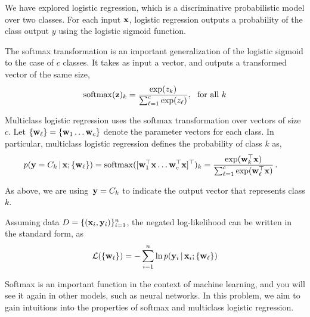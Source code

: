 \documentclass[submit]{harvardml}
\begin{document}
\newpage
\begin{problem}
%
  We have explored logistic regression, which is a discriminative
  probabilistic model over two classes. For each input $\mathbf{x}$,
  logistic regression outputs a probability of the class output $y$
  using the logistic sigmoid function.

  The softmax transformation is an important generalization of the logistic
  sigmoid to the case of $c$ classes. It takes as input a vector, and
  outputs a transformed vector of the same size,
%
  \[ \mathrm{softmax}(\mathbf{z})_k =\frac{\exp(z_k)}{\sum_{\ell=1}^c \exp(z_{\ell})}, \ \ \text{for all $k$}\]

Multiclass logistic regression uses the softmax transformation over vectors of size $c$. Let $\{\mathbf{w}_{\ell}\} = \{\mathbf{w}_1 \ldots \mathbf{w}_c \} $
denote the parameter vectors for each class.
In particular,  multiclass logistic regression
defines the probability of class $k$ as,
%
\begin{align*}
  p(\mathbf{y}=C_k \,|\, \mathbf{x}; \{\mathbf{w}_{\ell}\})
  &= \mathrm{softmax}([\mathbf{w}_1^{\top}\mathbf{x} \ldots \mathbf{w}_c^{\top} \mathbf{x}]^\top)_k =  \frac{ \exp( \mathbf{w}_k^{\top}\mathbf{x} ) }
  {  \sum_{\ell=1}^c \exp( \mathbf{w}_{\ell}^{\top}\mathbf{x} ) }\,.
\end{align*}

\noindent  As above, we are
using~$\mathbf{y} = {C_{k}}$ to indicate the output
vector that represents class $k$.

Assuming data $D = \{(\mathbf{x}_i, \mathbf{y}_i)\}_{i=1}^n$,
the negated log-likelihood  can be written in the standard form, as
%
\[\mathcal{L}(\{\mathbf{w}_{\ell}\}) = - \sum_{i=1}^n \ln  p(\mathbf{y}_i \,|\, \mathbf{x}_i; \{\mathbf{w}_{\ell}\}) \]


Softmax is an important function in the context of machine learning,
and you will see it again in other models, such as neural networks.
In this problem, we aim to gain intuitions into the properties of
softmax and multiclass logistic regression.


\end{problem}
\end{document}
